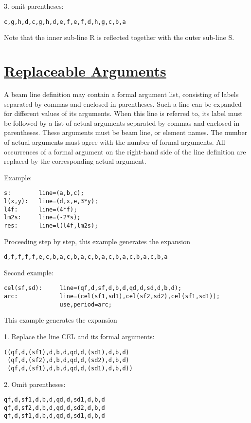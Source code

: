 3. omit parentheses: 
\begin{verbatim}
c,g,h,d,c,g,h,d,e,f,e,f,d,h,g,c,b,a
\end{verbatim}  
Note that the inner sub-line R is reflected together with the outer
sub-line S.   

\section{\href{argument}{Replaceable Arguments}} 
A beam line definition may contain a formal argument list, consisting of
labels separated by commas and enclosed in parentheses. Such a line can
be expanded for different values of its arguments. When this line is
referred to, its label must be followed by a list of actual arguments
separated by commas and enclosed in parentheses. These arguments must be
beam line, or element names. The number of actual arguments must agree
with the number of formal arguments. All occurrences of a formal
argument on the right-hand side of the line definition are replaced by
the corresponding actual argument.  

Example: 
\begin{verbatim}
s:        line=(a,b,c);
l(x,y):   line=(d,x,e,3*y);
l4f:      line=(4*f);
lm2s:     line=(-2*s);
res:      line=l(l4f,lm2s);
\end{verbatim} 

Proceeding step by step, this example generates the expansion 
\begin{verbatim}
d,f,f,f,f,e,c,b,a,c,b,a,c,b,a,c,b,a,c,b,a,c,b,a
\end{verbatim} 

Second example: 
\begin{verbatim}
cel(sf,sd):     line=(qf,d,sf,d,b,d,qd,d,sd,d,b,d);
arc:            line=(cel(sf1,sd1),cel(sf2,sd2),cel(sf1,sd1));
                use,period=arc;
\end{verbatim} 
This example generates the expansion 

 1. Replace the line CEL and its formal arguments: 
\begin{verbatim}
((qf,d,(sf1),d,b,d,qd,d,(sd1),d,b,d)
 (qf,d,(sf2),d,b,d,qd,d,(sd2),d,b,d)
 (qf,d,(sf1),d,b,d,qd,d,(sd1),d,b,d))
\end{verbatim}

 2. Omit parentheses: 
\begin{verbatim}
qf,d,sf1,d,b,d,qd,d,sd1,d,b,d
qf,d,sf2,d,b,d,qd,d,sd2,d,b,d
qf,d,sf1,d,b,d,qd,d,sd1,d,b,d
\end{verbatim}

